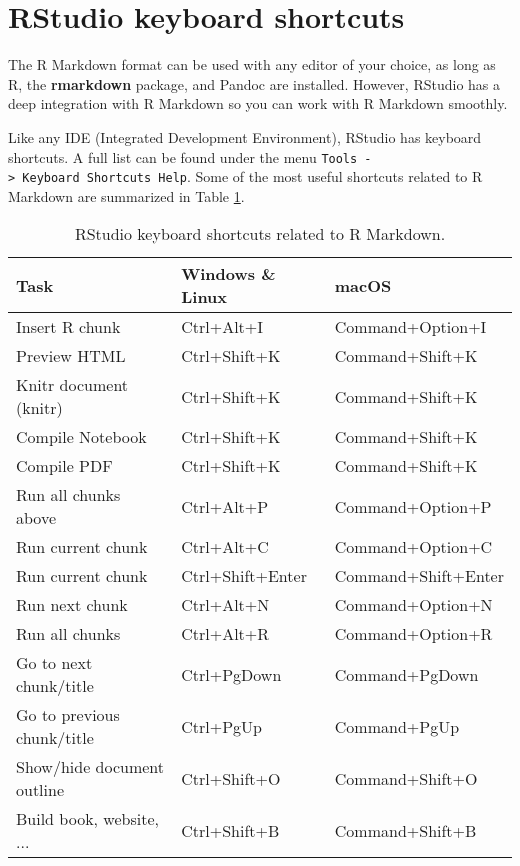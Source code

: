 \documentclass[
  11pt,
]{krantz}
\begin{document}
\hypertarget{rstudio-shortcuts}{%
\section{RStudio keyboard shortcuts}\label{rstudio-shortcuts}}

The R Markdown format can be used with any editor of your choice, as long as R, the \textbf{rmarkdown} package, and Pandoc are installed. However, RStudio has a deep integration with R Markdown so you can work with R Markdown smoothly.

Like any IDE (Integrated Development Environment), RStudio has keyboard shortcuts. A full list can be found under the menu \texttt{Tools\ -\textgreater{}\ Keyboard\ Shortcuts\ Help}. Some of the most useful shortcuts related to R Markdown are summarized in Table \ref{tab:shortcuts}.

\begin{table}

\caption{\label{tab:shortcuts}RStudio keyboard shortcuts related to R Markdown.}
\centering
\begin{tabular}[t]{lll}
\toprule
Task & Windows \& Linux & macOS\\
\midrule
Insert R chunk & Ctrl+Alt+I & Command+Option+I\\
Preview HTML & Ctrl+Shift+K & Command+Shift+K\\
Knitr document (knitr) & Ctrl+Shift+K & Command+Shift+K\\
Compile Notebook & Ctrl+Shift+K & Command+Shift+K\\
Compile PDF & Ctrl+Shift+K & Command+Shift+K\\
\addlinespace
Run all chunks above & Ctrl+Alt+P & Command+Option+P\\
Run current chunk & Ctrl+Alt+C & Command+Option+C\\
Run current chunk & Ctrl+Shift+Enter & Command+Shift+Enter\\
Run next chunk & Ctrl+Alt+N & Command+Option+N\\
Run all chunks & Ctrl+Alt+R & Command+Option+R\\
\addlinespace
Go to next chunk/title & Ctrl+PgDown & Command+PgDown\\
Go to previous chunk/title & Ctrl+PgUp & Command+PgUp\\
Show/hide document outline & Ctrl+Shift+O & Command+Shift+O\\
Build book, website, ... & Ctrl+Shift+B & Command+Shift+B\\
\bottomrule
\end{tabular}
\end{table}
\end{document}
